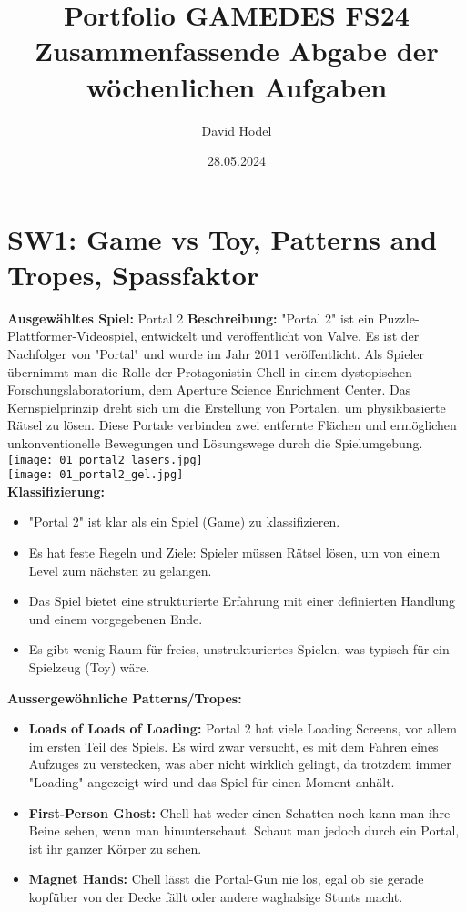 \documentclass{article}
\title{%
Portfolio GAMEDES FS24\\
\large Zusammenfassende Abgabe der \\
  wöchenlichen Aufgaben}
\author{David Hodel}
\date{28.05.2024}
\begin{document}
\maketitle
\newpage

\tableofcontents
\newpage

\section{SW1: Game vs Toy, Patterns and Tropes, Spassfaktor}

\textbf{Ausgewähltes Spiel:} Portal 2
\textbf{Beschreibung:} "Portal 2" ist ein Puzzle-Plattformer-Videospiel, entwickelt und veröffentlicht von Valve.
Es ist der Nachfolger von "Portal" und wurde im Jahr 2011 veröffentlicht. Als Spieler übernimmt man die Rolle der Protagonistin
Chell in einem dystopischen Forschungslaboratorium, dem Aperture Science Enrichment Center. Das Kernspielprinzip dreht sich um die
Erstellung von Portalen, um physikbasierte Rätsel zu lösen. Diese Portale verbinden zwei entfernte Flächen und ermöglichen
unkonventionelle Bewegungen und Lösungswege durch die Spielumgebung.
\\
\texttt{[image: 01\_portal2\_lasers.jpg]}
\\
\texttt{[image: 01\_portal2\_gel.jpg]}
\\
\textbf{Klassifizierung:}
\begin{itemize}
    \item "Portal 2" ist klar als ein Spiel (Game) zu klassifizieren.
    \item Es hat feste Regeln und Ziele: Spieler müssen Rätsel lösen, um von einem Level zum nächsten zu gelangen.
    \item Das Spiel bietet eine strukturierte Erfahrung mit einer definierten Handlung und einem vorgegebenen Ende.
    \item Es gibt wenig Raum für freies, unstrukturiertes Spielen, was typisch für ein Spielzeug (Toy) wäre.
\end{itemize}
\bigskip
\textbf{Aussergewöhnliche Patterns/Tropes:}
\begin{itemize}
    \item \textbf{Loads of Loads of Loading:} Portal 2 hat viele Loading Screens, vor allem im ersten Teil des Spiels.
    Es wird zwar versucht, es mit dem Fahren eines Aufzuges zu verstecken, was aber nicht wirklich gelingt, da trotzdem immer
    "Loading" angezeigt wird und das Spiel für einen Moment anhält.
    \item \textbf{First-Person Ghost:} Chell hat weder einen Schatten noch kann man ihre Beine sehen, wenn man hinunterschaut.
    Schaut man jedoch durch ein Portal, ist ihr ganzer Körper zu sehen.
    \item \textbf{Magnet Hands:} Chell lässt die Portal-Gun nie los, egal ob sie gerade kopfüber von der Decke fällt oder andere
    waghalsige Stunts macht.
\end{itemize}
\end{document}
